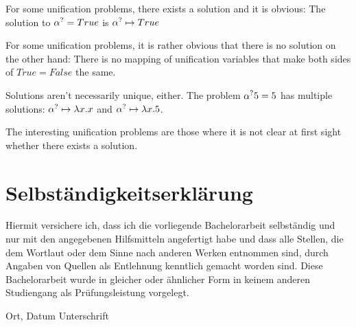 \documentclass[twoside,12pt,a4paper]{article}
\begin{document}
For some unification problems, there exists a solution and it is obvious:
The solution to $\alpha^? = True$ is $\alpha^? \mapsto True$

For some unification problems, it is rather obvious that there is no solution on the other hand:
There is no mapping of unification variables that make both sides of $True = False$ the same.

Solutions aren't necessarily unique, either. The problem $\alpha^? 5 = 5$ has multiple solutions: 
$\alpha^? \mapsto \lambda x.x$ and $\alpha^? \mapsto \lambda x.5$. %

The interesting unification problems are those where it is not clear at first sight whether there exists a solution.






%
%

\cleardoublepage

\thispagestyle{empty}
\section*{Selbst\"andigkeitserkl\"arung}

Hiermit versichere ich, dass ich die vorliegende Bachelorarbeit 
selbst\"andig und nur mit den angegebenen Hilfsmitteln angefertigt habe und dass alle Stellen, die dem Wortlaut oder dem 
Sinne nach anderen Werken entnommen sind, durch Angaben von Quellen als 
Entlehnung kenntlich gemacht worden sind. 
Diese Bachelorarbeit wurde in gleicher oder \"ahnlicher Form in keinem anderen 
Studiengang als Pr\"ufungsleistung vorgelegt. 

\vskip 3cm

Ort, Datum	\hfill Unterschrift \hfill 


\end{document}
